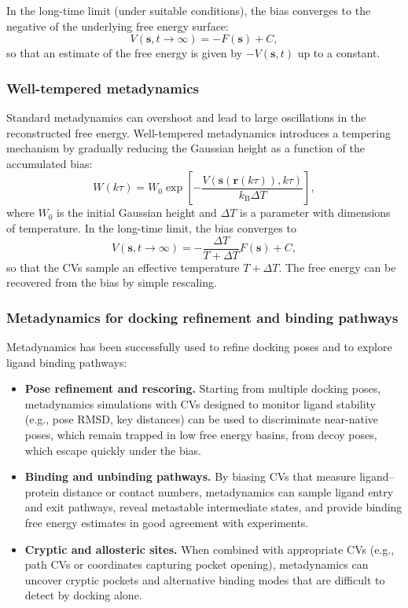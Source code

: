 \documentclass[12pt,a4paper]{article}
\begin{document}
In the long-time limit (under suitable conditions), the bias converges to the negative of the underlying free energy surface:
\[
V(\mathbf{s},t\to\infty) = -F(\mathbf{s}) + C,
\]
so that an estimate of the free energy is given by \(-V(\mathbf{s},t)\) up to a constant.

\subsubsection{Well-tempered metadynamics}

Standard metadynamics can overshoot and lead to large oscillations in the reconstructed free energy. Well-tempered metadynamics introduces a tempering mechanism by gradually reducing the Gaussian height as a function of the accumulated bias:\cite{Barducci2008}
\[
W(k\tau) = W_0 \exp\left[-\frac{V(\mathbf{s}(\mathbf{r}(k\tau)),k\tau)}{k_{\mathrm{B}}\Delta T}\right],
\]
where \(W_0\) is the initial Gaussian height and \(\Delta T\) is a parameter with dimensions of temperature. In the long-time limit, the bias converges to
\[
V(\mathbf{s}, t\to\infty) = -\frac{\Delta T}{T + \Delta T} F(\mathbf{s}) + C,
\]
so that the CVs sample an effective temperature \(T + \Delta T\). The free energy can be recovered from the bias by simple rescaling.

\subsubsection{Metadynamics for docking refinement and binding pathways}

Metadynamics has been successfully used to refine docking poses and to explore ligand binding pathways:

\begin{itemize}
\item \textbf{Pose refinement and rescoring.} Starting from multiple docking poses, metadynamics simulations with CVs designed to monitor ligand stability (e.g., pose RMSD, key distances) can be used to discriminate near-native poses, which remain trapped in low free energy basins, from decoy poses, which escape quickly under the bias.\cite{Capelli2022,Weber2016}
\item \textbf{Binding and unbinding pathways.} By biasing CVs that measure ligand--protein distance or contact numbers, metadynamics can sample ligand entry and exit pathways, reveal metastable intermediate states, and provide binding free energy estimates in good agreement with experiments.\cite{Tiwary2013,Callea2021}
\item \textbf{Cryptic and allosteric sites.} When combined with appropriate CVs (e.g., path CVs or coordinates capturing pocket opening), metadynamics can uncover cryptic pockets and alternative binding modes that are difficult to detect by docking alone.
\end{itemize}
\end{document}

